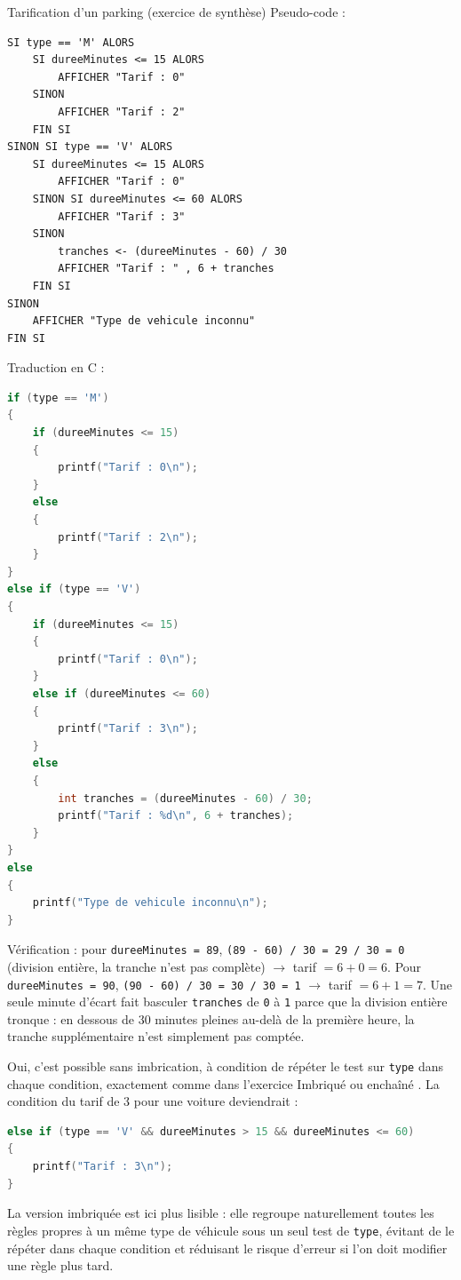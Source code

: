 \begin{UPSTIprofOnlyEnv}
    \begin{UPSTIcorrectionP}{Tarification d'un parking (exercice de synthèse)}
        Pseudo-code :
        \begin{verbatim}
SI type == 'M' ALORS
    SI dureeMinutes <= 15 ALORS
        AFFICHER "Tarif : 0"
    SINON
        AFFICHER "Tarif : 2"
    FIN SI
SINON SI type == 'V' ALORS
    SI dureeMinutes <= 15 ALORS
        AFFICHER "Tarif : 0"
    SINON SI dureeMinutes <= 60 ALORS
        AFFICHER "Tarif : 3"
    SINON
        tranches <- (dureeMinutes - 60) / 30
        AFFICHER "Tarif : " , 6 + tranches
    FIN SI
SINON
    AFFICHER "Type de vehicule inconnu"
FIN SI
        \end{verbatim}

        Traduction en C :
        \begin{lstlisting}[language=C]
if (type == 'M')
{
    if (dureeMinutes <= 15)
    {
        printf("Tarif : 0\n");
    }
    else
    {
        printf("Tarif : 2\n");
    }
}
else if (type == 'V')
{
    if (dureeMinutes <= 15)
    {
        printf("Tarif : 0\n");
    }
    else if (dureeMinutes <= 60)
    {
        printf("Tarif : 3\n");
    }
    else
    {
        int tranches = (dureeMinutes - 60) / 30;
        printf("Tarif : %d\n", 6 + tranches);
    }
}
else
{
    printf("Type de vehicule inconnu\n");
}
        \end{lstlisting}

        Vérification : pour \texttt{dureeMinutes = 89}, \texttt{(89 - 60) / 30 = 29 / 30 = 0} (division entière, la tranche n'est pas complète) $\to$ tarif $= 6 + 0 = \boxed{6}$. Pour \texttt{dureeMinutes = 90}, \texttt{(90 - 60) / 30 = 30 / 30 = 1} $\to$ tarif $= 6 + 1 = \boxed{7}$. Une seule minute d'écart fait basculer \texttt{tranches} de \texttt{0} à \texttt{1} parce que la division entière tronque : en dessous de 30 minutes pleines au-delà de la première heure, la tranche supplémentaire n'est simplement pas comptée.

        Oui, c'est possible sans imbrication, à condition de répéter le test sur \texttt{type} dans chaque condition, exactement comme dans l'exercice \og Imbriqué ou enchaîné \fg. La condition du tarif de 3 pour une voiture deviendrait :
        \begin{lstlisting}[language=C]
else if (type == 'V' && dureeMinutes > 15 && dureeMinutes <= 60)
{
    printf("Tarif : 3\n");
}
        \end{lstlisting}
        La version imbriquée est ici plus lisible : elle regroupe naturellement toutes les règles propres à un même type de véhicule sous un seul test de \texttt{type}, évitant de le répéter dans chaque condition et réduisant le risque d'erreur si l'on doit modifier une règle plus tard.
    \end{UPSTIcorrectionP}
\end{UPSTIprofOnlyEnv}


